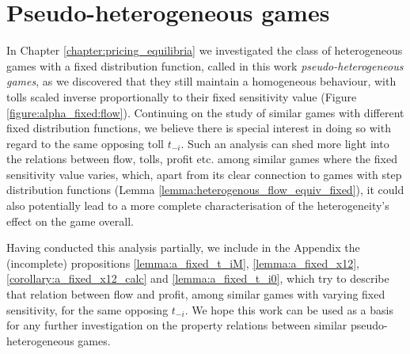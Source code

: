\documentclass[10pt,a4paper]{book}
\theoremstyle{definition}
\theoremstyle{comment}
\begin{document}

\section*{Pseudo-heterogeneous games}

In Chapter \ref{chapter:pricing_equilibria} we investigated the class of heterogeneous games with a fixed distribution function, called in this work \textit{pseudo-heterogeneous games}, as we discovered that they still maintain a homogeneous behaviour, with tolls scaled inverse proportionally to their fixed sensitivity value (Figure \ref{figure:alpha_fixed:flow}).
Continuing on the study of similar games with different fixed distribution functions, we believe there is special interest in doing so with regard to the same opposing toll $t_{-i}$.
Such an analysis can shed more light into the relations between flow, tolls, profit etc. among similar games where the fixed sensitivity value varies, which, apart from its clear connection to games with step distribution functions (Lemma \ref{lemma:heterogenous_flow_equiv_fixed}), it could also potentially lead to a more complete characterisation of the heterogeneity's effect on the game overall.

Having conducted this analysis partially, we include in the Appendix the (incomplete) propositions \ref{lemma:a_fixed_t_iM}, \ref{lemma:a_fixed_x12}, \ref{corollary:a_fixed_x12_calc} and \ref{lemma:a_fixed_t_i0}, which try to describe that relation between flow and profit, among similar games with varying fixed sensitivity, for the same opposing $t_{-i}$.
We hope this work can be used as a basis for any further investigation on the property relations between similar pseudo-heterogeneous games.
\end{document}
